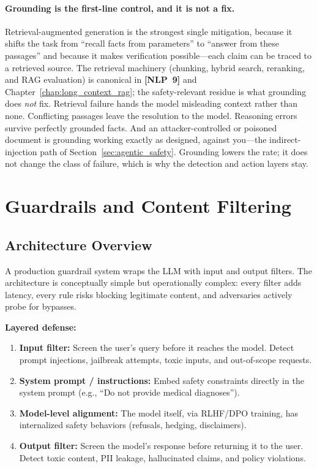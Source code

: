 \paragraph{Grounding is the first-line control, and it is not a fix.}
\label{sec:rag_grounding}
Retrieval-augmented generation is the strongest single mitigation, because it
shifts the task from ``recall facts from parameters'' to ``answer from these
passages'' and because it makes verification possible---each claim can be
traced to a retrieved source. The retrieval machinery (chunking, hybrid search,
reranking, and RAG evaluation) is canonical in \textbf{[NLP~9]} and
Chapter~\ref{chap:long_context_rag}; the safety-relevant residue is what
grounding does \emph{not} fix. Retrieval failure hands the model misleading
context rather than none. Conflicting passages leave the resolution to the
model. Reasoning errors survive perfectly grounded facts. And an
attacker-controlled or poisoned document is grounding working exactly as
designed, against you---the indirect-injection path of
Section~\ref{sec:agentic_safety}. Grounding lowers the rate; it does not change
the class of failure, which is why the detection and action layers stay.

\section{Guardrails and Content Filtering}
\label{sec:guardrails}

\subsection{Architecture Overview}

A production guardrail system wraps the LLM with input and output filters. The architecture is conceptually simple but operationally complex: every filter adds latency, every rule risks blocking legitimate content, and adversaries actively probe for bypasses.

\textbf{Layered defense:}
\begin{enumerate}
    \item \textbf{Input filter:} Screen the user's query before it reaches the model. Detect prompt injections, jailbreak attempts, toxic inputs, and out-of-scope requests.
    \item \textbf{System prompt / instructions:} Embed safety constraints directly in the system prompt (e.g., ``Do not provide medical diagnoses'').
    \item \textbf{Model-level alignment:} The model itself, via RLHF/DPO training, has internalized safety behaviors (refusals, hedging, disclaimers).
    \item \textbf{Output filter:} Screen the model's response before returning it to the user. Detect toxic content, PII leakage, hallucinated claims, and policy violations.
\end{enumerate}


